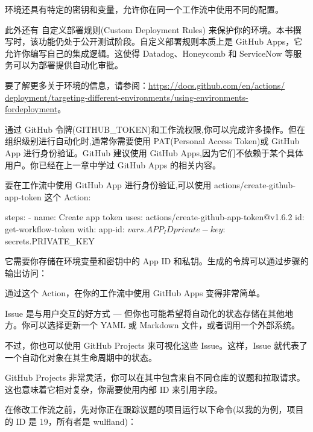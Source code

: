 环境还具有特定的密钥和变量，允许你在同一个工作流中使用不同的配置。

此外还有 自定义部署规则(Custom Deployment Rules) 来保护你的环境。本书撰写时，该功能仍处于公开测试阶段。自定义部署规则本质上是 GitHub Apps，它允许你编写自己的集成逻辑。这使得 Datadog、Honeycomb 和 ServiceNow 等服务可以为部署提供自动化审批。

要了解更多关于环境的信息，请参阅：\url{https://docs.github.com/en/actions/ deployment/targeting-different-environments/using-environments-fordeployment}。


通过 GitHub 令牌(GITHUB\_TOKEN)和工作流权限,你可以完成许多操作。但在组织级别进行自动化时,通常你需要使用 PAT(Personal Access Token)或 GitHub App 进行身份验证。GitHub 建议使用 GitHub Apps,因为它们不依赖于某个具体用户。你已经在上一章中学过 GitHub Apps 的相关内容。

要在工作流中使用 GitHub App 进行身份验证,可以使用 actions/create-github-app-token 这个 Action:

\begin{shell}
steps:
  - name: Create app token
    uses: actions/create-github-app-token@v1.6.2
    id: get-workflow-token
    with:
      app-id: ${{ vars.APP_ID }}
      private-key: ${{ secrets.PRIVATE_KEY }}
\end{shell}

它需要你存储在环境变量和密钥中的 App ID 和私钥。生成的令牌可以通过步骤的输出访问：


通过这个 Action，在你的工作流中使用 GitHub Apps 变得非常简单。


Issue 是与用户交互的好方式 --- 但你也可能希望将自动化的状态存储在其他地方。你可以选择更新一个 YAML 或 Markdown 文件，或者调用一个外部系统。

不过，你也可以使用 GitHub Projects 来可视化这些 Issue。这样，Issue 就代表了一个自动化对象在其生命周期中的状态。

GitHub Projects 非常灵活，你可以在其中包含来自不同仓库的议题和拉取请求。这也意味着它相对复杂，你需要使用内部 ID 来引用字段。

在修改工作流之前，先对你正在跟踪议题的项目运行以下命令(以我的为例，项目的 ID 是 19，所有者是 wulfland)：

